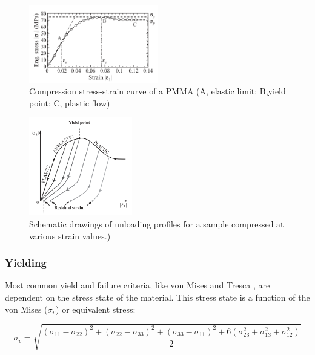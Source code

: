 \begin{figure}[H]
    \centering
    \includegraphics[width=0.5\textwidth]{chapter_2/figures/SSPMMA.png}
    \caption{Compression stress-strain curve of a PMMA (A, elastic limit; B,yield point; C, plastic flow)\cite{Halary2011PolymerMaterials}}
    \label{fig:SSPMMA}
   \end{figure}
\begin{figure}[H]
    \centering
    \includegraphics[width=0.4\textwidth]{chapter_2/figures/SSresidual.png}
    \caption{Schematic drawings of unloading profiles for a sample compressed at various strain values.)\cite{Halary2011PolymerMaterials}}
    \label{fig:SSresidual}
   \end{figure}
\subsubsection{Yielding}
Most common yield and failure criteria, like von Mises and Tresca \cite{Christensen2013TheFailure}, are dependent on the stress state of the material. This stress state is a function of the von Mises ($\sigma_v$) or equivalent stress:

\begin{equation}\label{von mises}
\sigma_v=\sqrt{\frac{(\sigma_{11}-\sigma_{22})^2+(\sigma_{22}-\sigma_{33})^2+(\sigma_{33}-\sigma_{11})^2 +6(\sigma_{23}^2+\sigma_{13}^2+\sigma_{12}^2)}{2}} 
\end{equation}


